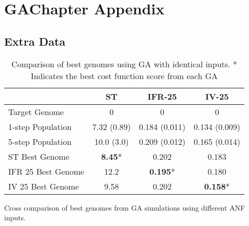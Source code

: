
\section{GAChapter Appendix}\label{sec:GA:chapter-5-appendix}

\subsection{Extra Data}

\begin{table}[htp]
  \centering
  \caption{Comparison of best genomes using {GA} with
    identical inputs. * Indicates the best cost function score from
    each {GA}}\label{tab:GA:4}
  \begin{tabular}{lccc}
\toprule
                   &       ST       &     IFR-25      & IV-25 \\
\midrule
  Target Genome    &       0        &        0        & 0 \\ %
1-step Population  &  7.32 (0.89)   &  0.184 (0.011)  & 0.134 (0.009)\\ %
5-step Population  &   10.0 (3.0)   &  0.209 (0.012)  & 0.165 (0.014) \\ %
 ST Best Genome    & \textbf{8.45}* &      0.202      & 0.183 \\ %
IFR 25 Best Genome  &      12.2      & \textbf{0.195}* & 0.180 \\ %
IV 25 Best Genome  &      9.58      &      0.202      & \textbf{0.158}* \\ %
\bottomrule
\end{tabular}
\end{table}


\begin{table}[tbh]
  \centering
  \caption{Cross comparison of best genomes from GA simulations using different ANF inputs.}
  \label{tab:GA:XComp}
%  
\end{table}




